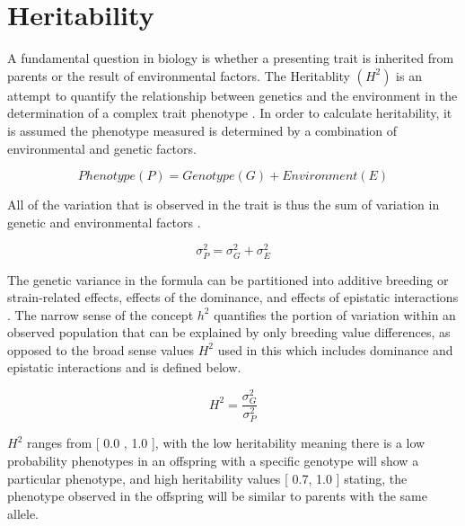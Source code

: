 \documentclass[a4paper,11pt,twoside]{book}
\begin{document}
	
	\section{Heritability}
	
	A fundamental question in biology is whether a presenting trait is inherited from parents or the result of environmental factors. The Heritablity $(H^2)$ is an attempt to quantify the relationship between genetics and the environment in the determination of a complex trait phenotype \citep{Visscher2008Heritabilitymisconceptions}. In order to calculate heritability, it is assumed the phenotype measured is determined by a combination of environmental and genetic factors. 

	\begin{equation} \label{eq1}
	Phenotype (P) = Genotype (G) + Environment (E) 
	\end{equation}

	All of the variation that is observed in the trait is thus the sum of variation in genetic and environmental factors  \citep{Visscher2008Heritabilitymisconceptions}.

	\begin{equation} \label{eq2}
	 \sigma_P^2 = \sigma_G^2 + \sigma_E^2
	\end{equation}
		
    The genetic variance in the formula can be partitioned into additive breeding or strain-related effects, effects of the dominance, and effects of epistatic interactions \citep{Visscher2008Heritabilitymisconceptions}. The narrow sense of the concept $h^2$ quantifies the portion of variation within an observed population that can be explained by only breeding value differences, as opposed to the broad sense values $H^2$ used in this which includes dominance and epistatic interactions and is defined below.
	
\begin{equation} \label{eq3}
H^2 = \dfrac{\sigma_G^2}{\sigma_P^2} 
\end{equation}
	

    $H^2$ ranges from [ 0.0 , 1.0 ], with the low heritability meaning there is a low probability phenotypes in an offspring with a specific genotype will show a particular phenotype, and high heritability values [ 0.7, 1.0 ] stating, the phenotype observed in the offspring will be similar to parents with the same allele.  
	
\end{document}

